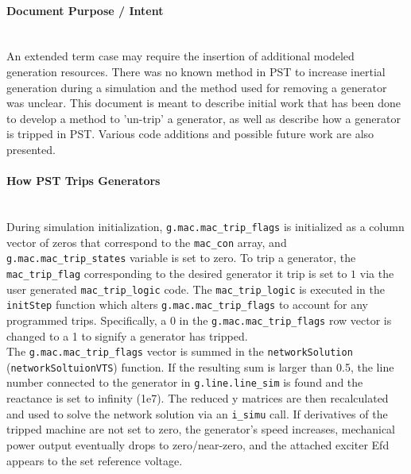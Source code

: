 \documentclass[12pt]{article}
\begin{document}
\onehalfspacing
\paragraph{Document Purpose / Intent} \ \\
An extended term case may require the insertion of additional modeled generation resources.
There was no known method in PST to increase inertial generation during a simulation and the method used for removing a generator was unclear.
This document is meant to describe initial work that has been done to develop a method to 'un-trip' a generator, as well as describe how a generator is tripped in PST.
Various code additions and possible future work are also presented.


\paragraph{How PST Trips Generators} \ \\
During simulation initialization, \verb|g.mac.mac_trip_flags| is initialized as a column vector of zeros that correspond to the \verb|mac_con| array, and 
\verb|g.mac.mac_trip_states| variable is set to zero. %
To trip a generator, the \verb|mac_trip_flag| corresponding to the desired generator it trip is set to $1$ via the user generated \verb|mac_trip_logic| code.
The \verb|mac_trip_logic| is executed in the \verb|initStep| function which alters \verb|g.mac.mac_trip_flags| to account for any programmed trips.
Specifically, a $0$ in the \verb|g.mac.mac_trip_flags| row vector is changed to a 1 to signify a generator has tripped.\\


The \verb|g.mac.mac_trip_flags| vector is summed in the \verb|networkSolution| (\verb|networkSoltuionVTS|) function.
If the resulting sum is larger than 0.5, the line number connected to the generator in \verb|g.line.line_sim| is found and the reactance is set to infinity (1e7).
The reduced y matrices are then recalculated and used to solve the network solution via an \verb|i_simu| call.
If derivatives of the tripped machine are not set to zero, the generator's speed increases, mechanical power output eventually drops to zero/near-zero, and the attached exciter Efd appears to the set reference voltage.

\end{document}
